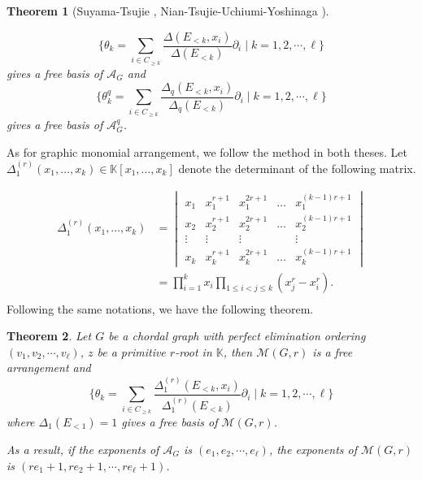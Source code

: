 \documentclass[12pt]{article}
\theoremstyle{plain}%
\newtheorem{theorem}{Theorem}[section]
\theoremstyle{definition}
\begin{document}
\begin{theorem}[Suyama-Tsujie \cite{suyama2019vertex-weighted-dcg}, Nian-Tsujie-Uchiumi-Yoshinaga \cite{nian2024qdeformationchromaticpolynomialsgraphical}]\label{freeness1}

$$\{\theta_{k} = \sum_{i \in C_{\geq k}}\dfrac{\Delta(E_{<k}, x_{i})}{\Delta(E_{<k})}\partial_{i}\mid k=1,2,\cdots,\ell\}$$
gives a free basis of $\mathcal{A}_G$ and
$$\{\theta^q_{k} = \sum_{i \in C_{\geq k}}\dfrac{\Delta_q(E_{<k}, x_{i})}{\Delta_q(E_{<k})}\partial_{i}\mid k=1,2,\cdots,\ell\}$$
gives a free basis of $\mathcal{A}_G^q$.
\end{theorem}


As for graphic monomial arrangement, we follow the method in both theses. Let $\Delta^{(r)}_1(x_{1}, \dots, x_{k}) \in \mathbb{K}[x_{1}, \dots, x_{k}]$ denote the determinant of the following matrix. 


\begin{align*}
\Delta^{(r)}_1(x_{1}, \dots, x_{k}) &= \begin{vmatrix}
x_{1} & x_{1}^{r+1} & x_{1}^{2r+1} & \dots & x_{1}^{(k-1)r+1} \\
x_{2} & x_{2}^{r+1} & x_{2}^{2r+1} & \dots & x_{2}^{(k-1)r+1} \\
\vdots & \vdots & \vdots &  & \vdots \\
x_{k} & x_{k}^{r+1} & x_{k}^{2r+1} & \dots & x_{k}^{(k-1)r+1}
\end{vmatrix}\\ 
&= \prod_{i=1}^k x_i \prod_{1\leq i < j \leq k} (x_j^{r}-x_i^{r}).\\ 
\end{align*}
Following the same notations, we have the following theorem.
\begin{theorem}
    Let $G$ be a chordal graph with perfect elimination ordering $(v_1,v_2,\cdots,v_\ell)$, $z$ be a primitive $r$-root in $\mathbb{K}$, then $\mathcal{M}(G,r)$ is a free arrangement and
    $$\{\theta_{k} = \sum_{i \in C_{\geq k}}\dfrac{\Delta^{(r)}_1(E_{<k}, x_{i})}{\Delta^{(r)}_1(E_{<k})}\partial_{i}\mid k=1,2,\cdots,\ell\}$$
where $\Delta_1(E_{<1})=1$ gives a free basis of $\mathcal{M}(G,r)$. 

As a result, if the exponents of $\mathcal{A}_G$ is $(e_1,e_2,\cdots,e_\ell)$, the exponents of $\mathcal{M}(G,r)$ is $(re_1+1,re_2+1,\cdots,re_\ell+1)$.
\end{theorem}
\end{document}
